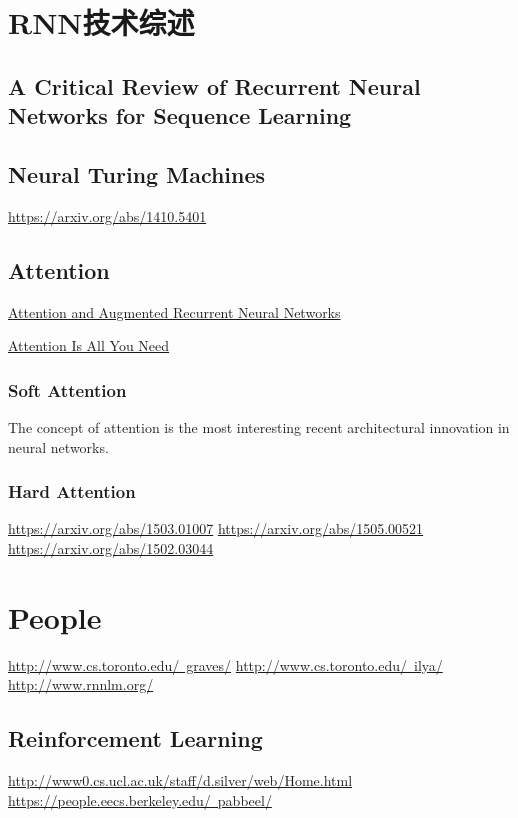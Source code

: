 \documentclass[UTF8,10pt,a4paper]{ctexbook}
\begin{document}
\section{RNN技术综述}

\subsection{A Critical Review of Recurrent Neural Networks for Sequence Learning}

\subsection{Neural Turing Machines}
\href{Neural Turing Machines}{https://arxiv.org/abs/1410.5401}

\subsection{Attention}
\href{https://distill.pub/2016/augmented-rnns/}{Attention and Augmented Recurrent Neural Networks}

\href{https://arxiv.org/abs/1706.03762}{Attention Is All You Need}

\subsubsection{Soft Attention}
The concept of attention is the most interesting recent architectural innovation in neural networks.

\subsubsection{Hard Attention}
\href{Inferring Algorithmic Patterns with Stack-Augmented Recurrent Nets}{https://arxiv.org/abs/1503.01007}
\href{Reinforcement Learning Neural Turing Machines - Revised}{https://arxiv.org/abs/1505.00521}
\href{Show, Attend and Tell: Neural Image Caption Generation with Visual Attention}{https://arxiv.org/abs/1502.03044}

\section{People}
\href{Alex Graves}{http://www.cs.toronto.edu/~graves/}
\href{Ilya Sutskever}{http://www.cs.toronto.edu/~ilya/}
\href{Tomas Mikolov}{http://www.rnnlm.org/}

\subsection{Reinforcement Learning}
\href{David Silver}{http://www0.cs.ucl.ac.uk/staff/d.silver/web/Home.html}
\href{Pieter Abbeel}{https://people.eecs.berkeley.edu/~pabbeel/}
\end{document}
